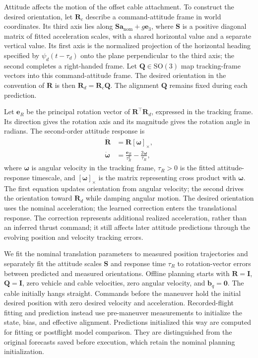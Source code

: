 \documentclass[letterpaper, 10 pt, conference]{ieeeconf}
\begin{document}
Attitude affects the motion of the offset cable attachment.
To construct the desired orientation, let $\mathbf{R}_c$ describe a
command-attitude frame in world coordinates. Its third axis lies
along $\mathbf{S}\mathbf{a}_{\mathrm{nom}}+g\mathbf{e}_3$, where $\mathbf{S}$ is a
positive diagonal matrix of fitted acceleration scales, with a
shared horizontal value and a separate vertical value. Its first
axis is the normalized projection of the horizontal heading
specified by $\psi_d(t-\tau_d)$ onto the plane perpendicular
to the third axis; the second completes a right-handed frame.
Let $\mathbf{Q}\in \mathrm{SO}(3)$ map tracking-frame vectors into this
command-attitude frame. The desired orientation in the convention
of $\mathbf{R}$ is then $\mathbf{R}_d=\mathbf{R}_c \mathbf{Q}$. The alignment $\mathbf{Q}$ remains fixed
during each prediction.

Let $\mathbf{e}_R$ be the principal rotation vector of
$\mathbf{R}^\top \mathbf{R}_d$, expressed in the tracking frame. Its direction
gives the rotation axis and its magnitude gives the rotation
angle in radians. The second-order attitude response is
\begin{equation}
\begin{aligned}
\dot{\mathbf{R}}&=\mathbf{R}[\boldsymbol\omega]_\times,\\
\dot{\boldsymbol\omega}
&=\frac{\mathbf{e}_R}{\tau_R^2}
-\frac{2\boldsymbol\omega}{\tau_R},
\end{aligned}
\label{eq:attitude_response}
\end{equation}
where $\boldsymbol\omega$ is angular velocity in the tracking
frame, $\tau_R>0$ is the fitted attitude-response timescale,
and $[\boldsymbol\omega]_\times$ is the matrix representing
cross product with $\boldsymbol\omega$.
The first equation updates orientation from angular velocity;
the second drives the orientation toward $\mathbf{R}_d$ while damping
angular motion. The desired orientation uses the nominal
acceleration; the learned correction enters the translational
response. The correction represents additional realized
acceleration, rather than an inferred thrust command; it still
affects later attitude predictions through the evolving position
and velocity tracking errors.

We fit the nominal translation parameters to measured position
trajectories and separately fit the attitude scales $\mathbf{S}$ and
response time $\tau_R$ to rotation-vector errors between predicted
and measured orientations.
Offline planning starts with $\mathbf{R}=\mathbf{I}$, $\mathbf{Q}=\mathbf{I}$,
zero vehicle and cable velocities, zero angular velocity,
and $\mathbf b_q=\mathbf0$.
The cable initially hangs straight. Commands before the maneuver
hold the initial desired position with zero desired velocity and
acceleration. Recorded-flight fitting and prediction instead use
pre-maneuver measurements to initialize the state, bias, and
effective alignment. Predictions initialized this way are computed
for fitting or postflight model comparison. They are distinguished
from the original forecasts saved before execution, which retain
the nominal planning initialization.
\end{document}
